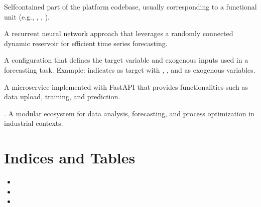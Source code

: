 \documentclass[letterpaper,10pt,english]{sphinxmanual}
\begin{document}
\begin{description}
\sphinxAtStartPar
Self\sphinxhyphen{}contained part of the platform codebase, usually corresponding to a
functional unit (e.g., , , ).

\sphinxAtStartPar
A recurrent neural network approach that leverages a randomly connected
dynamic reservoir for efficient time series forecasting.

\sphinxAtStartPar
A configuration that defines the target variable and exogenous inputs used
in a forecasting task. Example:  indicates
 as target with , , and 
as exogenous variables.

\sphinxAtStartPar
A microservice implemented with FastAPI that provides functionalities such
as data upload, training, and prediction.

\sphinxAtStartPar
{}. A modular ecosystem for
data analysis, forecasting, and process optimization in industrial contexts.

\end{description}


\chapter{Indices and Tables}
\label{\detokenize{index:indices-and-tables}}\begin{itemize}
\item {} 
\sphinxAtStartPar
{}

\item {} 
\sphinxAtStartPar
{}

\item {} 
\sphinxAtStartPar
{}

\end{itemize}



\renewcommand{\indexname}{Index}
\printindex
\end{document}
